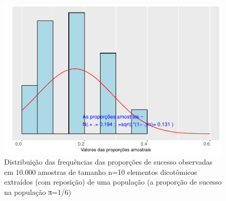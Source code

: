 \documentclass[
]{book}
\begin{document}
\begin{figure}

{\centering \includegraphics[width=1\linewidth]{apostila_files/figure-latex/fig65-1} 

}

\caption{Distribuição das frequências das proporções de sucesso observadas em 10.000 amostras de tamanho n=10 elementos dicotômicos extraídos (com reposição) de uma população 
(a proporção de sucesso na população π=1/6)}\label{fig:fig65}
\end{figure}

\hfill\break
\end{document}
